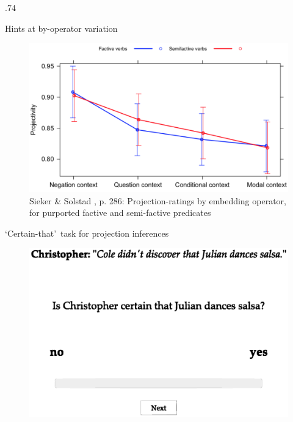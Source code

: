 \documentclass[final, table, cmyk]{beamer}
\newlength{\colwidth}
\newlength{\vboxsep}
\begin{document}
\begin{frame}[t]
\begin{columns}[t]
\begin{column}{.74\colwidth}
\begin{normalbox}{Hints at by-operator variation}
				

				\begin{figure}[h]
					\vspace{-.2\baselineskip}
					\centering
					\includegraphics[width=.7\linewidth]{sieker-solstad.png}
					\vspace{-.4\baselineskip}
					\caption{Sieker \& Solstad \citeyear{sieker_projective_2022}, p. 286: Projection-ratings by embedding operator, for purported factive and semi-factive predicates}
				\end{figure}
				\vspace{-.8\baselineskip}
			\end{normalbox}

			\vspace{\vboxsep}
			\begin{normalbox}{\lq Certain-that\rq\ task for projection inferences}

				\begin{figure}[h]
					\centering
					\includegraphics[width=.6\linewidth]{task-1n-proj.eps}
					\label{fig:task}
				\end{figure}

\end{normalbox}
\end{column}
\end{columns}
\end{frame}
\end{document}
